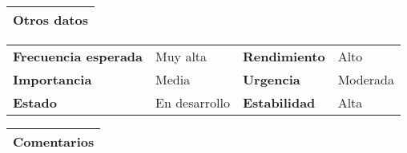\documentclass[11pt,a4paper]{article}
\begin{document}
\begin{table}[H]
	\begin{tabularx}{\textwidth}{X}
		\textbf{Otros datos}\\ \hline
	\end{tabularx}
	\begin{tabularx}{\textwidth}{lXlX}
		\textbf{Frecuencia esperada} & Muy alta & \textbf{Rendimiento} & Alto\\
		\textbf{Importancia} & Media & \textbf{Urgencia} & Moderada\\
		\textbf{Estado} & En desarrollo & \textbf{Estabilidad} & Alta\\
	\end{tabularx}
	
	\begin{tabularx}{\textwidth}{X}
		\textbf{Comentarios}\\ \hline
	\end{tabularx}
\end{table}


\end{document}
